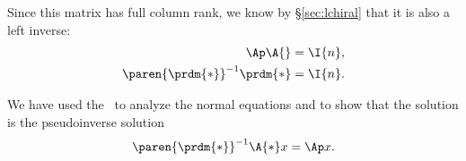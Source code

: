 Since this matrix has full column rank, we know by \S \eqref{sec:lchiral} that it is also a left inverse:
\begin{equation}
  \begin{split}
     \Ap \A{} &= \I{n}, \\
     \paren{\prdm{*}}^{-1}\prdm{*} &= \I{n}.
  \end{split}
\end{equation}

We have used the \svdl\ to analyze the normal equations and to show that the solution is the pseudoinverse solution
\begin{equation}
  \paren{\prdm{*}}^{-1}\A{*}x = \Ap x.
\end{equation}


\endinput